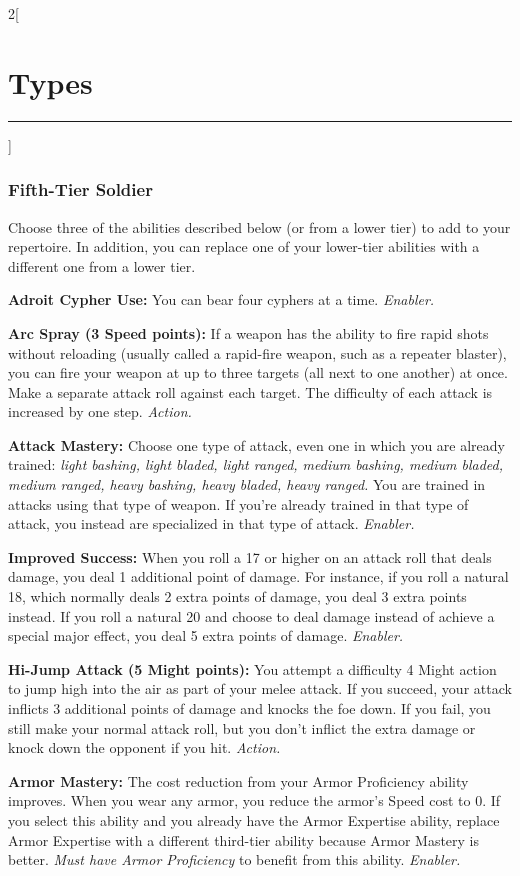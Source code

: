 \documentclass[a4paper,10pt,final]{book}
\newcommand{\HRule}{\rule{\linewidth}{0.5mm}} %
\newcommand{\newSection}[1]{\section*{#1} \addcontentsline{toc}{section}{#1} \label{sec:#1} \HRule}
\newcommand{\itemAbility}[2]{\textcolor{25gray}{\textbullet\textbf{ #1:}} {#2}\par}
\newcommand{\enabler}{\textit{ Enabler.}}
\newcommand{\action}{\textit{ Action.}}
\newenvironment{docsection}[1]
{
  \begin{multicols*}{2}[\newSection{#1}]
}
{
  \end{multicols*}
  \newpage
}
\begin{document}
\begin{docsection}{Types}

\subsubsection*{Fifth-Tier Soldier}
\label{subsub:soldierFifthTier}

Choose three of the abilities described below (or from a lower tier) to add to your repertoire. In addition, you can replace one of your lower-tier abilities with a different one from a lower tier.

\itemAbility{Adroit Cypher Use}{You can bear four cyphers at a time.\enabler}

\itemAbility{Arc Spray (3 Speed points)}{If a weapon has the ability to fire rapid shots without reloading (usually called a rapid-fire weapon, such as a repeater blaster), you can fire your weapon at up to three targets (all next to one another) at once. Make a separate attack roll against each target. The difficulty of each attack is increased by one step.\action}

\itemAbility{Attack Mastery}{Choose one type of attack, even one in which you are already trained: \textit{light bashing, light bladed, light ranged, medium bashing, medium bladed, medium ranged, heavy bashing, heavy bladed, heavy ranged.} You are trained in attacks using that type of weapon. If you’re already trained in that type of attack, you instead are specialized in that type of attack.\enabler}

\itemAbility{Improved Success}{When you roll a 17 or higher on an attack roll that deals damage, you deal 1 additional point of damage. For instance, if you roll a natural 18, which normally deals 2 extra points of damage, you deal 3 extra points instead. If you roll a natural 20 and choose to deal damage instead of achieve a special major effect, you deal 5 extra points of damage.\enabler}

\itemAbility{Hi-Jump Attack (5 Might points)}{You attempt a difficulty 4 Might action to jump high into the air as part of your melee attack. If you succeed, your attack inflicts 3 additional points of damage and knocks the foe down. If you fail, you still make your normal attack roll, but you don’t inflict the extra damage or knock down the opponent if you hit.\action}

\itemAbility{Armor Mastery}{The cost reduction from your Armor Proficiency ability improves. When you wear any armor, you reduce the armor’s Speed cost to 0. If you select this ability and you already have the Armor Expertise ability, replace Armor Expertise with a different third-tier ability because Armor Mastery is better. \textit{Must have Armor Proficiency} to benefit from this ability.\enabler}


\end{docsection}
\end{document}
